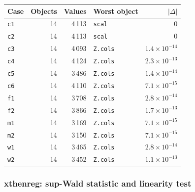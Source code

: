 \documentclass[
  10.5pt,
  a4paper,
]{article}
\begin{document}
\begin{longtable}{@{}p{3.6cm}rrp{4.9cm}r@{}}
\toprule
Case & Objects & Values & Worst object & $|\Delta|$ \\
\midrule
\endhead
\texttt{c1} & 14 & 4\,113 & \texttt{scal} & 0 \\
\texttt{c2} & 14 & 4\,113 & \texttt{scal} & 0 \\
\texttt{c3} & 14 & 4\,093 & \texttt{Z.cols} & $1.4\times10^{-14}$ \\
\texttt{c4} & 14 & 4\,124 & \texttt{Z.cols} & $2.3\times10^{-13}$ \\
\texttt{c5} & 14 & 3\,486 & \texttt{Z.cols} & $1.4\times10^{-14}$ \\
\texttt{c6} & 14 & 4\,110 & \texttt{Z.cols} & $7.1\times10^{-15}$ \\
\texttt{f1} & 14 & 3\,708 & \texttt{Z.cols} & $2.8\times10^{-14}$ \\
\texttt{f2} & 14 & 3\,866 & \texttt{Z.cols} & $1.7\times10^{-13}$ \\
\texttt{m1} & 14 & 3\,169 & \texttt{Z.cols} & $7.1\times10^{-15}$ \\
\texttt{m2} & 14 & 3\,150 & \texttt{Z.cols} & $7.1\times10^{-15}$ \\
\texttt{w1} & 14 & 3\,465 & \texttt{Z.cols} & $2.8\times10^{-14}$ \\
\texttt{w2} & 14 & 3\,452 & \texttt{Z.cols} & $1.1\times10^{-13}$ \\
\bottomrule
\end{longtable}

\subsubsection*{xthenreg: sup-Wald statistic and linearity test}
\end{document}
